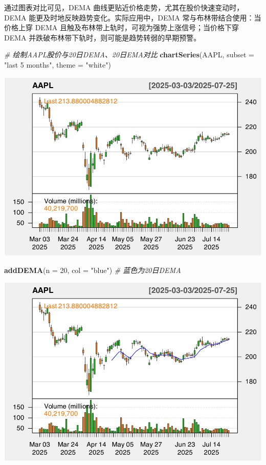 \documentclass[]{ctexbook}
\newenvironment{Shaded}{\begin{snugshade}}{\end{snugshade}}
\newcommand{\AttributeTok}[1]{\textcolor[rgb]{0.13,0.29,0.53}{#1}}
\newcommand{\CommentTok}[1]{\textcolor[rgb]{0.56,0.35,0.01}{\textit{#1}}}
\newcommand{\DecValTok}[1]{\textcolor[rgb]{0.00,0.00,0.81}{#1}}
\newcommand{\FunctionTok}[1]{\textcolor[rgb]{0.13,0.29,0.53}{\textbf{#1}}}
\newcommand{\NormalTok}[1]{#1}
\newcommand{\StringTok}[1]{\textcolor[rgb]{0.31,0.60,0.02}{#1}}
\begin{document}
通过图表对比可见，DEMA 曲线更贴近价格走势，尤其在股价快速变动时，DEMA 能更及时地反映趋势变化。实际应用中，DEMA 常与布林带结合使用：当价格上穿 DEMA 且触及布林带上轨时，可视为强势上涨信号；当价格下穿 DEMA 并跌破布林带下轨时，则可能是趋势转弱的早期预警。

\begin{Shaded}
\begin{Highlighting}[]
\CommentTok{\# 绘制AAPL股价与20日DEMA、20日EMA对比}
\FunctionTok{chartSeries}\NormalTok{(AAPL, }\AttributeTok{subset =} \StringTok{"last 5 months"}\NormalTok{, }\AttributeTok{theme =} \StringTok{"white"}\NormalTok{)}
\end{Highlighting}
\end{Shaded}

\includegraphics[width=0.9\linewidth]{QuantmodHandbook_files/figure-latex/dema_2-1}

\begin{Shaded}
\begin{Highlighting}[]
\FunctionTok{addDEMA}\NormalTok{(}\AttributeTok{n =} \DecValTok{20}\NormalTok{, }\AttributeTok{col =} \StringTok{"blue"}\NormalTok{)    }\CommentTok{\# 蓝色为20日DEMA}
\end{Highlighting}
\end{Shaded}

\includegraphics[width=0.9\linewidth]{QuantmodHandbook_files/figure-latex/dema_2-2}
\end{document}
